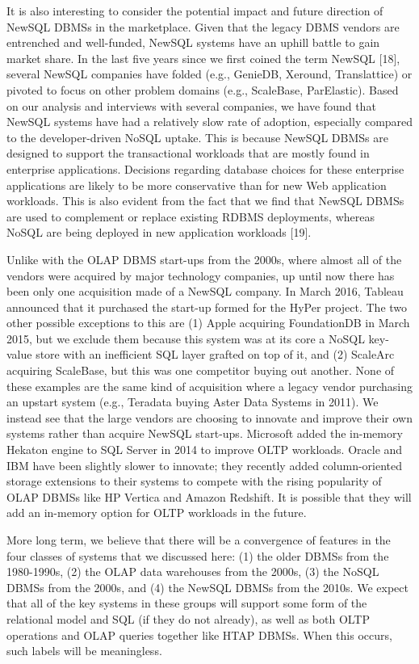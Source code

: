 \documentclass[a4paper,11pt,twoside,openright]{article}
\begin{document}
It is also interesting to consider the potential impact and future
direction of NewSQL DBMSs in the marketplace. Given that the legacy DBMS
vendors are entrenched and well-funded, NewSQL systems have an uphill
battle to gain market share. In the last five years since we first
coined the term NewSQL {[}18{]}, several NewSQL companies have folded
(e.g., GenieDB, Xeround, Translattice) or pivoted to focus on other
problem domains (e.g., ScaleBase, ParElastic). Based on our analysis and
interviews with several companies, we have found that NewSQL systems
have had a relatively slow rate of adoption, especially compared to the
developer-driven NoSQL uptake. This is because NewSQL DBMSs are designed
to support the transactional workloads that are mostly found in
enterprise applications. Decisions regarding database choices for these
enterprise applications are likely to be more conservative than for new
Web application workloads. This is also evident from the fact that we
find that NewSQL DBMSs are used to complement or replace existing RDBMS
deployments, whereas
NoSQL are being deployed in new application workloads {[}19{]}.

Unlike with the OLAP DBMS start-ups from the 2000s, where almost all of
the vendors were acquired by major technology companies, up until now
there has been only one acquisition made of a NewSQL company. In March
2016, Tableau announced that it purchased the start-up formed for the
HyPer project. The two other possible exceptions to this are (1) Apple
acquiring FoundationDB in March 2015, but we exclude them because this
system was at its core a NoSQL key-value store with an inefficient SQL
layer grafted on top of it, and (2) ScaleArc acquiring ScaleBase, but
this was one competitor buying out another. None of these examples are
the same kind of acquisition where a legacy vendor purchasing an upstart
system (e.g., Teradata buying Aster Data Systems in 2011). We instead
see that the large vendors are choosing to innovate and improve their
own systems rather than acquire NewSQL start-ups. Microsoft added the
in-memory Hekaton engine to SQL Server in 2014 to improve OLTP
workloads. Oracle and IBM have been slightly slower to innovate; they
recently added column-oriented storage extensions to their systems to
compete with the rising popularity of OLAP DBMSs like HP Vertica and
Amazon Redshift. It is possible that they will add an in-memory option
for OLTP workloads in the future.

More long term, we believe that there will be a convergence of features
in the four classes of systems that we discussed here: (1) the older
DBMSs from the 1980-1990s, (2) the OLAP data warehouses from the 2000s,
(3) the NoSQL DBMSs from the 2000s, and (4) the NewSQL DBMSs from the
2010s. We expect that all of the key systems in these groups will
support some form of the relational model and SQL (if they do not
already), as well as both OLTP operations and OLAP queries together like
HTAP DBMSs. When this occurs, such labels will be meaningless.
\end{document}

